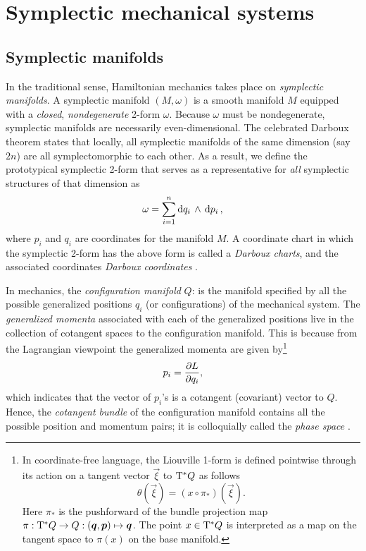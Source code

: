 \section{Symplectic mechanical systems}
\label{sec:symplectic}

\subsection{Symplectic manifolds}
In the traditional sense, Hamiltonian mechanics takes place on \emph{symplectic manifolds}. A symplectic manifold $(M, \omega)$ is a smooth manifold $M$ equipped with a \emph{closed}, \emph{nondegenerate} 2-form $\omega$. Because $\omega$ must be nondegenerate, symplectic manifolds are necessarily even-dimensional. The celebrated Darboux theorem states that locally, all symplectic manifolds of the same dimension (say $2n$) are all symplectomorphic to each other. As a result, we define the prototypical symplectic 2-form that serves as a representative for \emph{all} symplectic structures of that dimension as
\begin{equation}
    \omega = \sum_{i = 1}^n  \dd{q_i}\,\wedge\,\dd{p_i} ,
    \label{eq:darboux_symplectic_form}
\end{equation}
where $p_i$ and $q_i$ are coordinates for the manifold $M$. A coordinate chart in which the symplectic 2-form has the above form is called a \emph{Darboux charts}, and the associated coordinates \emph{Darboux coordinates} \cite{Cannas2001, Arnold1989}.

In mechanics, the \emph{configuration manifold} $Q$: is the manifold specified by all the possible generalized positions $q_i$ (or configurations) of the mechanical system. The \emph{generalized momenta} associated with each of the generalized positions live in the collection of cotangent spaces to the configuration manifold. This is because from the Lagrangian viewpoint the generalized momenta are given by\footnote
{
    In coordinate-free language, the Liouville 1-form is defined pointwise through its action on a tangent vector $\vec{\xi}$ to $\mathrm{T}^*Q$ as follows
    $$ \theta(\vec{\xi}) = (x \circ \pi_*) (\vec{\xi}). $$
    Here $\pi_*$ is the pushforward of the bundle projection map $\pi: \ctbundle{Q} \to Q: (\vec{q}, \vec{p}) \mapsto \vec{q}$. The point $x \in \mathrm{T}^*Q$ is interpreted as a map on the tangent space to $\pi(x)$ on the base manifold.
}
$$ p_i = \pdv{L}{q_i}, $$
which indicates that the vector of $p_i$'s is a cotangent (covariant) vector to $Q$. Hence, the \emph{cotangent bundle} of the configuration manifold contains all the possible position and momentum pairs; it is colloquially called the \emph{phase space} \cite{Abraham1978,Arnold1989,Libermann1987}.

